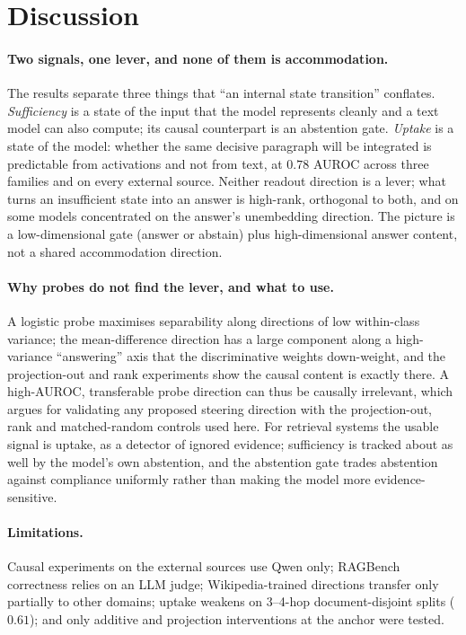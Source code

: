 \section{Discussion}
\label{sec:discussion}

\paragraph{Two signals, one lever, and none of them is accommodation.}
The results separate three things that ``an internal state transition'' conflates. \emph{Sufficiency} is a state of the input that the model represents cleanly and a text model can also compute; its causal counterpart is an abstention gate. \emph{Uptake} is a state of the model: whether the same decisive paragraph will be integrated is predictable from activations and not from text, at $0.78$ AUROC across three families and on every external source. Neither readout direction is a lever; what turns an insufficient state into an answer is high-rank, orthogonal to both, and on some models concentrated on the answer's unembedding direction. The picture is a low-dimensional gate (answer or abstain) plus high-dimensional answer content, not a shared accommodation direction.

\paragraph{Why probes do not find the lever, and what to use.}
A logistic probe maximises separability along directions of low within-class variance; the mean-difference direction has a large component along a high-variance ``answering'' axis that the discriminative weights down-weight, and the projection-out and rank experiments show the causal content is exactly there. A high-AUROC, transferable probe direction can thus be causally irrelevant, which argues for validating any proposed steering direction with the projection-out, rank and matched-random controls used here. For retrieval systems the usable signal is uptake, as a detector of ignored evidence; sufficiency is tracked about as well by the model's own abstention, and the abstention gate trades abstention against compliance uniformly rather than making the model more evidence-sensitive.

\paragraph{Limitations.}
Causal experiments on the external sources use Qwen only; RAGBench correctness relies on an LLM judge; Wikipedia-trained directions transfer only partially to other domains; uptake weakens on 3--4-hop document-disjoint splits ($0.61$); and only additive and projection interventions at the anchor were tested.
